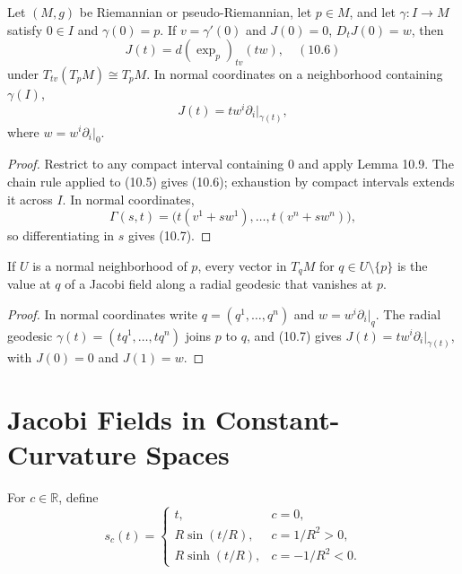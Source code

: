 \begin{proposition}
\label{prop:jacobi-fields-vanishing-at-point}
Let $(M,g)$ be Riemannian or pseudo-Riemannian, let $p\in M$, and let
$\gamma:I\to M$ satisfy $0\in I$ and $\gamma(0)=p$.  If
$v=\gamma'(0)$ and $J(0)=0$, $D_tJ(0)=w$, then
\[
J(t)=d(\exp_p)_{tv}(tw), \quad (10.6)
\]
under $T_{tv}(T_pM)\cong T_pM$.  In normal coordinates on a neighborhood
containing $\gamma(I)$,
\begin{equation}
J(t)=tw^i\partial_i\bigg|_{\gamma(t)}, \tag{10.7}
\end{equation}
where $w=w^i\partial_i|_0$.
\end{proposition}

\begin{proof}
\sketch
Restrict to any compact interval containing $0$ and apply Lemma 10.9.  The
chain rule applied to (10.5) gives (10.6); exhaustion by compact intervals
extends it across $I$.  In normal coordinates,
\[
\Gamma(s,t)=\bigl(t(v^1+sw^1),\ldots,t(v^n+sw^n)\bigr),
\]
so differentiating in $s$ gives (10.7).
\end{proof}

\begin{corollary}
\label{cor:jacobi-field-tangent-vectors}

If $U$ is a normal neighborhood of $p$, every vector in $T_qM$ for
$q\in U\setminus\{p\}$ is the value at $q$ of a Jacobi field along a radial
geodesic that vanishes at $p$.
\end{corollary}

\begin{proof}
\sketch
In normal coordinates write $q=(q^1,\ldots,q^n)$ and
$w=w^i\partial_i|_q$.  The radial geodesic
$\gamma(t)=(tq^1,\ldots,tq^n)$ joins $p$ to $q$, and (10.7) gives
$J(t)=tw^i\partial_i|_{\gamma(t)}$, with $J(0)=0$ and $J(1)=w$.
\end{proof}

\section{Jacobi Fields in Constant-Curvature Spaces}

For $c\in\mathbb R$, define
\begin{equation}
s_c(t)=\begin{cases}
t,&c=0,\\
R\sin(t/R),&c=1/R^2>0,\\
R\sinh(t/R),&c=-1/R^2<0.
\end{cases} \tag{10.8}
\end{equation}

